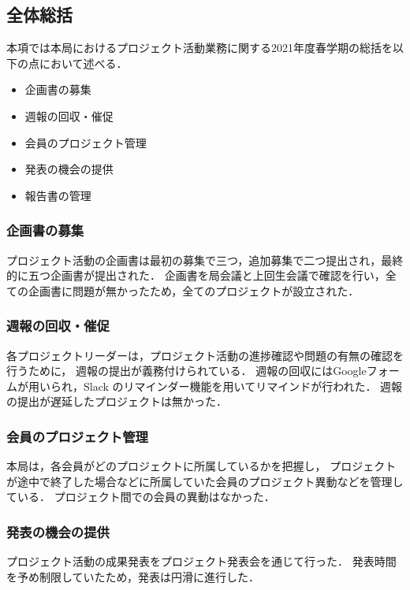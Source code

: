 \subsection*{全体総括}



本項では本局におけるプロジェクト活動業務に関する2021年度春学期の総括を以下の点において述べる．

\begin{itemize}
\item 企画書の募集
\item 週報の回収・催促
\item 会員のプロジェクト管理
\item 発表の機会の提供
\item 報告書の管理
\end{itemize}

\subsubsection*{企画書の募集}

プロジェクト活動の企画書は最初の募集で三つ，追加募集で二つ提出され，最終的に五つ企画書が提出された．
企画書を局会議と上回生会議で確認を行い，全ての企画書に問題が無かったため，全てのプロジェクトが設立された．

\subsubsection*{週報の回収・催促}

各プロジェクトリーダーは，プロジェクト活動の進捗確認や問題の有無の確認を行うために，
週報の提出が義務付けられている．
週報の回収にはGoogleフォームが用いられ，Slack のリマインダー機能を用いてリマインドが行われた．
週報の提出が遅延したプロジェクトは無かった．

\subsubsection*{会員のプロジェクト管理}

本局は，各会員がどのプロジェクトに所属しているかを把握し，
プロジェクトが途中で終了した場合などに所属していた会員のプロジェクト異動などを管理している．
プロジェクト間での会員の異動はなかった．

\subsubsection*{発表の機会の提供}

プロジェクト活動の成果発表をプロジェクト発表会を通じて行った．
発表時間を予め制限していたため，発表は円滑に進行した．
